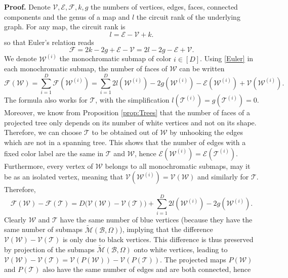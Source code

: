 \documentclass[aps,prd,10pt,notitlepage,nofootinbib,superscriptaddress,showkeys,showpacs]{revtex4-1}
\begin{document}
{\bf Proof.} Denote ${\mathcal{V}}, {\mathcal{E}}, {\mathcal{F}}, k, g$ the numbers of vertices, edges, faces, connected components and the genus of a map and $l$ the circuit rank of the underlying graph. For any map, the circuit rank is
\begin{equation}
l = {\mathcal{E}} - {\mathcal{V}} + k.
\end{equation}
so that Euler's relation reads
\begin{equation} \label{Euler}
{\mathcal{F}} = 2k - 2g + {\mathcal{E}} - {\mathcal{V}} = 2l - 2g - {\mathcal{E}} + {\mathcal{V}}.
\end{equation}
We denote ${\mathcal{W}}^{(i)}$ the monochromatic submap of color $i\in[D]$. Using \eqref{Euler} in each monochromatic submap, the number of faces of ${\mathcal{W}}$ can be written
\begin{equation}
{\mathcal{F}}({\mathcal{W}}) = \sum_{i=1}^D {\mathcal{F}}({\mathcal{W}}^{(i)}) = \sum_{i=1}^D 2l({\mathcal{W}}^{(i)}) - 2g({\mathcal{W}}^{(i)}) - {\mathcal{E}}({\mathcal{W}}^{(i)}) + {\mathcal{V}}({\mathcal{W}}^{(i)}).
\end{equation}
The formula also works for ${\mathcal{T}}$, with the simplification $l({\mathcal{T}}^{(i)}) = g({\mathcal{T}}^{(i)}) = 0$. Moreover, we know from Proposition \ref{prop:Trees} that the number of faces of a projected tree only depends on its number of white vertices and not on its shape. Therefore, we can choose ${\mathcal{T}}$ to be obtained out of ${\mathcal{W}}$ by unhooking the edges which are not in a spanning tree. This shows that the number of edges with a fixed color label are the same in ${\mathcal{T}}$ and ${\mathcal{W}}$, hence ${\mathcal{E}}({\mathcal{W}}^{(i)}) = {\mathcal{E}}({\mathcal{T}}^{(i)})$. Furthermore, every vertex of ${\mathcal{W}}$ belongs to all monochromatic submaps, may it be as an isolated vertex, meaning that ${\mathcal{V}}({\mathcal{W}}^{(i)}) = {\mathcal{V}}({\mathcal{W}})$ and similarly for ${\mathcal{T}}$. Therefore,
\begin{equation}
{\mathcal{F}}({\mathcal{W}}) - {\mathcal{F}}({\mathcal{T}}) = D \bigl({\mathcal{V}}({\mathcal{W}}) - {\mathcal{V}}({\mathcal{T}})\bigr) + \sum_{i=1}^D 2l({\mathcal{W}}^{(i)}) - 2g({\mathcal{W}}^{(i)}).
\end{equation}
Clearly ${\mathcal{W}}$ and ${\mathcal{T}}$ have the same number of blue vertices (because they have the same number of submaps $\tilde{\mathcal{M}}({\mathcal{B}}, \Omega)$), implying that the difference ${\mathcal{V}}({\mathcal{W}}) - {\mathcal{V}}({\mathcal{T}})$ is only due to black vertices. This difference is thus preserved by projection of the submaps $\tilde{\mathcal{M}}({\mathcal{B}}, \Omega)$ onto white vertices, leading to ${\mathcal{V}}({\mathcal{W}}) - {\mathcal{V}}({\mathcal{T}}) = {\mathcal{V}}(P({\mathcal{W}})) - {\mathcal{V}}(P({\mathcal{T}}))$. The projected maps $P({\mathcal{W}})$ and $P({\mathcal{T}})$ also have the same number of edges and are both connected, hence
\end{document}
